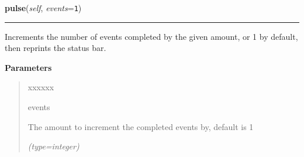 \hspace{.8\funcindent}\begin{boxedminipage}{\funcwidth}

    \raggedright \textbf{pulse}(\textit{self}, \textit{events}={\tt 1})

    \vspace{-1.5ex}

    \rule{\textwidth}{0.5\fboxrule}
\setlength{\parskip}{2ex}
    Increments the number of events completed by the given amount, or 1 by 
    default, then reprints the status bar.

\setlength{\parskip}{1ex}
      \textbf{Parameters}
      \vspace{-1ex}

      \begin{quote}
        \begin{Ventry}{xxxxxx}

          \item[events]

          The amount to increment the completed events by, default is 1

            {\it (type=integer)}

        \end{Ventry}

      \end{quote}

    \end{boxedminipage}

    \label{morpher:misc:status_reporter:StatusReporter:correct}

    \vspace{0.5ex}

